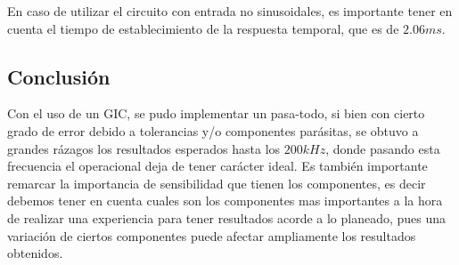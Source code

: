 En caso de utilizar el circuito con entrada no sinusoidales, es importante tener en cuenta el tiempo de establecimiento de la respuesta temporal, que es de $2.06ms$. 

\subsection{Conclusión}

Con el uso de un GIC, se pudo implementar un pasa-todo, si bien con cierto grado de error debido a tolerancias y/o componentes parásitas, se obtuvo a grandes rázagos los resultados esperados hasta los $200kHz$, donde pasando esta frecuencia el operacional deja de tener carácter ideal. Es también importante remarcar la importancia de sensibilidad que tienen los componentes, es decir debemos tener en cuenta cuales son los componentes mas importantes a la hora de realizar una experiencia para tener resultados acorde a lo planeado, pues una variación de ciertos componentes puede afectar ampliamente los resultados obtenidos. 

